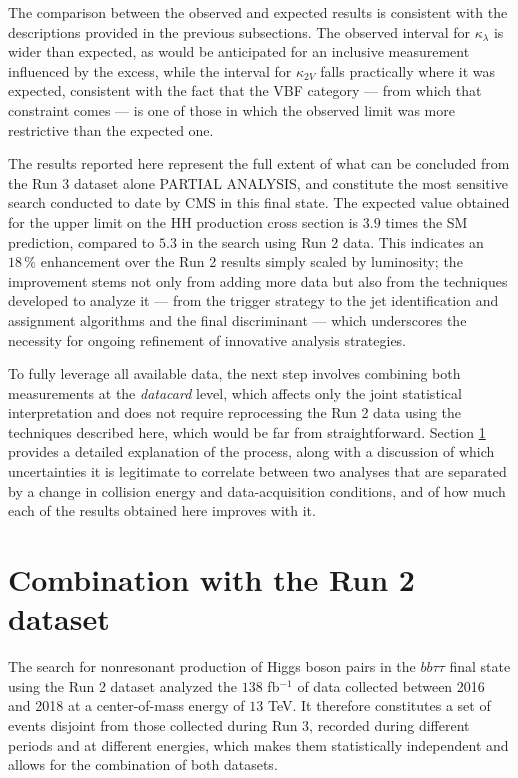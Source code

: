 The comparison between the observed and expected results is consistent with the descriptions provided in the previous subsections. The observed interval for $\kappa_\lambda$ is wider than expected, as would be anticipated for an inclusive measurement influenced by the excess, while the interval for $\kappa_{2V}$ falls practically where it was expected, consistent with the fact that the VBF category — from which that constraint comes — is one of those in which the observed limit was more restrictive than the expected one.\bigskip




The results reported here represent the full extent of what can be concluded from the Run 3 dataset alone PARTIAL ANALYSIS, and constitute the most sensitive search conducted to date by CMS in this final state. The expected value obtained for the upper limit on the HH production cross section is $3.9$ times the SM prediction, compared to $5.3$ in the search using Run 2 data. This indicates an $18\,\%$ enhancement over the Run 2 results simply scaled by luminosity; the improvement stems not only from adding more data but also from the techniques developed to analyze it — from the trigger strategy to the jet identification and assignment algorithms and the final discriminant — which underscores the necessity for ongoing refinement of innovative analysis strategies.

To fully leverage all available data, the next step involves combining both measurements at the \textit{datacard} level, which affects only the joint statistical interpretation and does not require reprocessing the Run 2 data using the techniques described here, which would be far from straightforward. Section \ref{sec:bbtt_combination} provides a detailed explanation of the process, along with a discussion of which uncertainties it is legitimate to correlate between two analyses that are separated by a change in collision energy and data-acquisition conditions, and of how much each of the results obtained here improves with it.




\section{Combination with the Run 2 dataset}
\label{sec:bbtt_combination}
%
The search for nonresonant production of Higgs boson pairs in the $bb\tau\tau$ final state using the Run 2 dataset \cite{CMS-HIG-20-010} analyzed the $138$ fb$^{-1}$ of data collected between 2016 and 2018 at a center-of-mass energy of $13$ TeV. It therefore constitutes a set of events disjoint from those collected during Run 3, recorded during different periods and at different energies, which makes them statistically independent and allows for the combination of both datasets.

